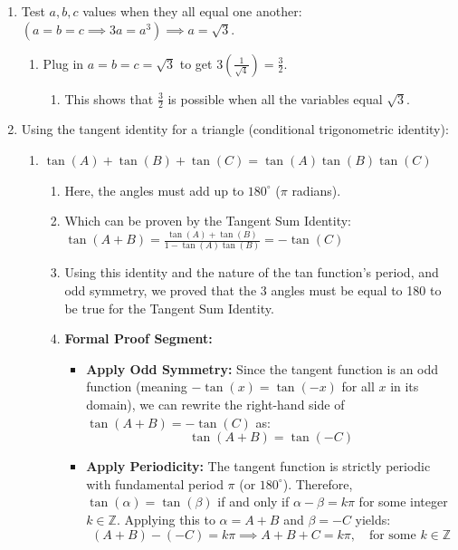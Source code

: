 \documentclass[12pt]{article}
\begin{document}
\begin{enumerate}
    \item Test $a, b, c$ values when they all equal one another: $(a = b = c \implies 3a = a^3) \implies a = \sqrt{3}$.
    \begin{enumerate}
        \item Plug in $a = b = c = \sqrt{3}$ to get $3\left(\frac{1}{\sqrt{4}}\right) = \frac{3}{2}$.
        \begin{enumerate}
            \item This shows that $\frac{3}{2}$ is possible when all the variables equal $\sqrt{3}$.
        \end{enumerate}
    \end{enumerate}

    \item Using the tangent identity for a triangle (conditional trigonometric identity):
    \begin{enumerate}
        \item $\tan(A) + \tan(B) + \tan(C) = \tan(A)\tan(B)\tan(C)$
        \begin{enumerate}
            \item Here, the angles must add up to $180^\circ$ ($\pi$ radians).
            \item Which can be proven by the Tangent Sum Identity: $\tan(A+B) = \frac{\tan(A) + \tan(B)}{1 - \tan(A)\tan(B)} = -\tan(C)$
            \item Using this identity and the nature of the tan function's period, and odd symmetry, we proved that the 3 angles must be equal to 180 to be true for the Tangent Sum Identity. 
            \item \textbf{Formal Proof Segment:}
            \begin{itemize}
                \item \textbf{Apply Odd Symmetry:} Since the tangent function is an odd function (meaning $-\tan(x) = \tan(-x)$ for all $x$ in its domain), we can rewrite the right-hand side of $\tan(A + B) = -\tan(C)$ as:
                \[
                    \tan(A + B) = \tan(-C)
                \]
                \item \textbf{Apply Periodicity:} The tangent function is strictly periodic with fundamental period $\pi$ (or $180^\circ$). Therefore, $\tan(\alpha) = \tan(\beta)$ if and only if $\alpha - \beta = k\pi$ for some integer $k \in \mathbb{Z}$. Applying this to $\alpha = A + B$ and $\beta = -C$ yields:
                \[
                    (A + B) - (-C) = k\pi \implies A + B + C = k\pi, \quad \text{for some } k \in \mathbb{Z}
\]
\end{itemize}
\end{enumerate}
\end{enumerate}
\end{enumerate}
\end{document}
